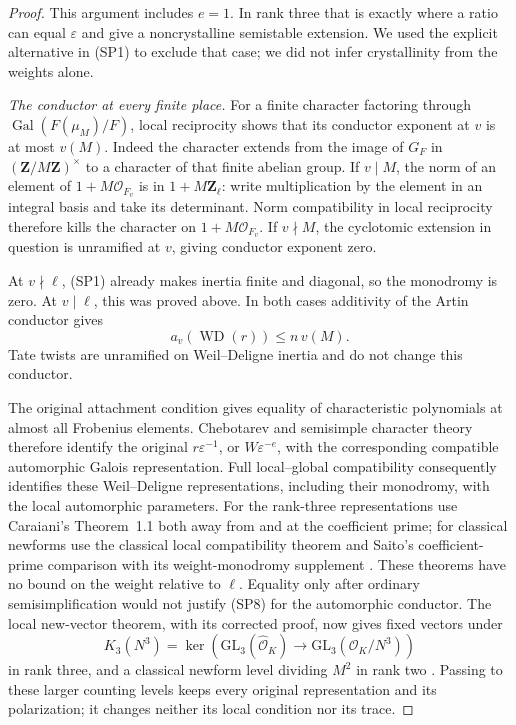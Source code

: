 \begin{proof}
This argument includes $e=1$.  In rank three that is exactly
where a ratio can equal $\varepsilon$ and give a noncrystalline
semistable extension.  We used the explicit alternative in
(SP1) to exclude that case; we did not infer crystallinity from
the weights alone.

\emph{The conductor at every finite place.}
For a finite character factoring through
$\operatorname{Gal}(F(\mu_M)/F)$, local reciprocity shows
that its conductor exponent at $v$ is at most $v(M)$.
Indeed the character extends from the image of $G_F$ in
$(\mathbf Z/M\mathbf Z)^\times$ to a character of that
finite abelian group.  If $v\mid M$, the norm of an element
of $1+M\mathcal O_{F_v}$ is in $1+M\mathbf Z_\ell$:
write multiplication by the element in an integral basis and
take its determinant.  Norm compatibility in local reciprocity
therefore kills the character on $1+M\mathcal O_{F_v}$.
If $v\nmid M$, the cyclotomic extension in question is
unramified at $v$, giving conductor exponent zero.

At $v\nmid\ell$, (SP1) already makes inertia finite and
diagonal, so the monodromy is zero.  At $v\mid\ell$, this
was proved above.  In both cases additivity of the Artin
conductor gives
\[
       a_v(\operatorname{WD}(r))\le n\,v(M).                  \tag{SP8}
\]
Tate twists are unramified on Weil--Deligne inertia and do
not change this conductor.

The original attachment condition gives equality of characteristic
polynomials at almost all Frobenius elements.  Chebotarev and
semisimple character theory therefore identify the original
$r\varepsilon^{-1}$, or $W\varepsilon^{-e}$, with the
corresponding compatible automorphic Galois representation.
Full local--global compatibility consequently identifies these
Weil--Deligne representations, including their monodromy,
with the local automorphic parameters.  For the rank-three
representations use Caraiani's Theorem~1.1 both away from
and at the coefficient prime; for classical newforms use
the classical local compatibility theorem and Saito's
coefficient-prime comparison with its weight-monodromy supplement
\cite{support-spectrum-Caraiani2012,support-spectrum-Caraiani2014,
support-spectrum-Saito}.  These theorems have no bound on
the weight relative to $\ell$.  Equality only after ordinary
semisimplification would not justify (SP8) for the
automorphic conductor.  The local new-vector theorem,
with its corrected proof, now gives fixed vectors under
\[
 K_3(N^3)=\ker\!\left(\mathrm{GL}_3(\widehat{\mathcal O}_K)
       \longrightarrow\mathrm{GL}_3(\mathcal O_K/N^3)\right)
                                                               \tag{SP9}
\]
in rank three, and a classical newform level dividing $M^2$
in rank two \cite{support-spectrum-newvector}.  Passing to
these larger counting levels keeps every original representation
and its polarization; it changes neither its local condition
nor its trace.


\end{proof}
